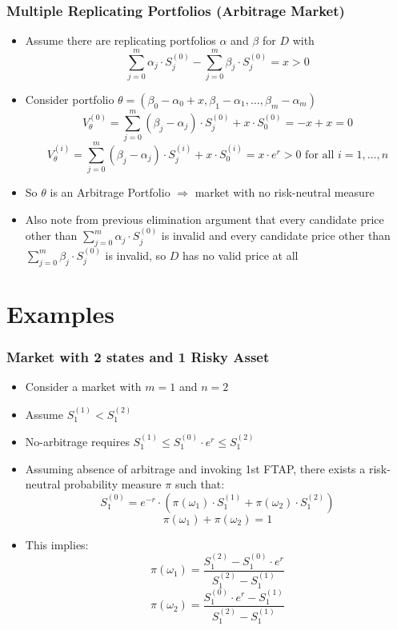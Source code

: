 \documentclass{beamer}
\begin{document}
\begin{frame}
\frametitle{Multiple Replicating Portfolios (Arbitrage Market)}
\begin{itemize}
\item Assume there are replicating portfolios $\alpha$ and $\beta$ for $D$
with $$\sum_{j=0}^m \alpha_j \cdot S_j^{(0)} -  \sum_{j=0}^m \beta_j \cdot S_j^{(0)} = x > 0$$
\item Consider portfolio $\theta = (\beta_0 - \alpha_0 + x, \beta_1 - \alpha_1, \ldots, \beta_m - \alpha_m)$
$$V_{\theta}^{(0)} = \sum_{j=0}^m (\beta_j - \alpha_j) \cdot S_j^{(0)} + x \cdot S_0^{(0)} = -x + x = 0$$
$$V_{\theta}^{(i)} = \sum_{j=0}^m (\beta_j - \alpha_j) \cdot S_j^{(i)} + x \cdot S_0^{(i)} = x \cdot e^r > 0 \mbox{ for all } i = 1, \ldots, n$$
\item So $\theta$ is an Arbitrage Portfolio $\Rightarrow$ market with no risk-neutral measure
\item Also note from previous elimination argument that every candidate price other than $\sum_{j=0}^m \alpha_j \cdot S_j^{(0)}$ is invalid and every candidate price other than $\sum_{j=0}^m \beta_j \cdot S_j^{(0)}$ is invalid, so $D$ has no valid price at all
 \end{itemize}
 \end{frame}

\section{Examples}

\begin{frame}
\frametitle{Market with 2 states and 1 Risky Asset}
\begin{itemize}
\item Consider a market with $m = 1$ and $n = 2$
\item Assume $S_1^{(1)} < S_1^{(2)}$
\item No-arbitrage requires $S_1^{(1)} \leq S_1^{(0)} \cdot e^r \leq S_1^{(2)}$
\item Assuming absence of arbitrage and invoking 1st FTAP, there exists a risk-neutral probability measure $\pi$ such that:
$$S_1^{(0)} = e^{-r} \cdot (\pi(\omega_1) \cdot S_1^{(1)} + \pi(\omega_2) \cdot S_1^{(2)})$$
$$\pi(\omega_1) + \pi(\omega_2) = 1$$
\item This implies:
$$\pi(\omega_1) = \frac {S_1^{(2)} - S_1^{(0)} \cdot e^r} {S_1^{(2)} - S_1^{(1)}}$$
$$\pi(\omega_2) = \frac {S_1^{(0)} \cdot e^r - S_1^{(1)}} {S_1^{(2)} - S_1^{(1)}}$$
\end{itemize}
\end{frame}
\end{document}
